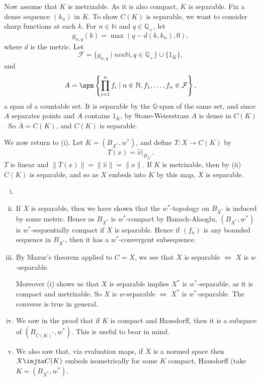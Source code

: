 \documentclass[12pt]{article}
\begin{document}
\begin{proofbox}
	Now assume that $K$ is metrizable. As it is also compact, $K$ is separable. Fix a dense sequence $(k_n)$ in $K$. To show $C(K)$ is separable, we want to consider sharp functions at each $k$. For $n \in \mathbb{N}$ and $q \in \mathbb{Q}_{+}$, let
	\[
	g_{n, q}(k) = \max(q - d(k, k_n), 0),
	\]
	where $d$ is the metric. Let
	\[
		\mathcal{F} = \{g_{n,q} \mid n in \mathbb{N}, q \in \mathbb{Q}_+\} \cup \{1_K\},
	\]
	and
	\[
		A = \spn \left\{ \prod_{i = 1}^n f_i \mid n \in \mathbb{N}, f_1, \ldots, f_n \in \mathcal{F}\right\},
	\]
	a span of a countable set. It is separable by the $\mathbb{Q}$-span of the same set, and since $A$ separates points and $A$ contains $1_K$, by Stone-Weierstrass $A$ is dense in $C(K)$. So $\bar A = C(K)$, and $C(K)$ is separable.

	We now return to (i). Let $K = (B_{X^{\ast}}, w^{\ast})$, and define $T : X \to C(K)$ by
	\[
	T(x) = \hat x|_{B_{X^{\ast}}}.
	\]
	$T$ is linear and $\|T(x)\| = \|\hat x\| = \|x\|$. If $K$ is metrizable, then by (ii) $C(K)$ is separable, and so as $X$ embeds into $K$ by this map, $X$ is separable.
\end{proofbox}

\begin{remark}
	\begin{enumerate}[(i)]
		\item[]
		\item If $X$ is separable, then we have shown that the $w^{\ast}$-topology on $B_{X^{\ast}}$ is induced by some metric. Hence as $B_{X^{\ast}}$ is $w^{\ast}$-compact by Banach-Alaoglu, $(B_{X^{\ast}}, w^{\ast})$ is $w^{\ast}$-sequentially compact if $X$ is separable. Hence if $(f_n)$ is any bounded sequence in $B_{X^{\ast}}$, then it has a $w^{\ast}$-convergent subsequence.

		\item By Mazur's theorem applied to $C = X$, we see that $X$ is separable $\iff$ $X$ is $w$-separable.

			Moreover (i) shows us that $X$ is separable implies $X^{\ast}$ is $w^{\ast}$-separable, as it is compact and metrizable. So $X$ is $w$-separable $\iff$ $X^{\ast}$ is $w^{\ast}$-separable. The converse is true in general.
		\item We saw in the proof that if $K$ is compact and Hausdorff, then it is a subspace of $(B_{C(K)^{\ast}}, w^{\ast})$. This is useful to bear in mind.
		\item We also saw that, via evaluation maps, if $X$ is a normed space then $X \injto C(K)$ embeds isometrically for some $K$ compact, Hausdorff (take $K = (B_{X^{\ast}}, w^{\ast})$.
	\end{enumerate}	
\end{remark}
\end{document}
